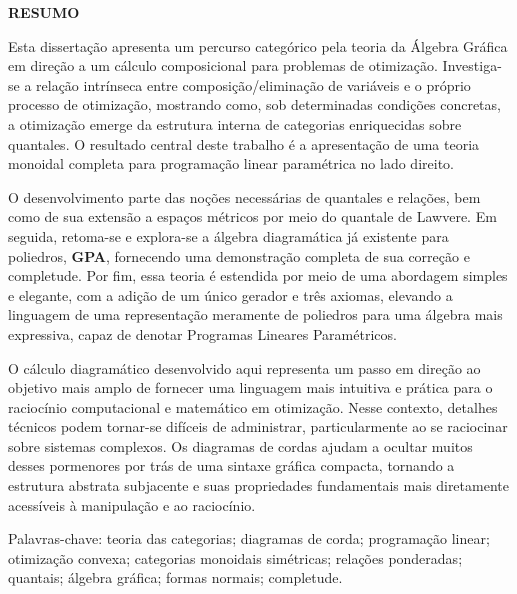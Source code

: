 \newpage
\thispagestyle{empty}
\begin{center}
  \textbf{\MakeUppercase{Resumo}}
\end{center}

\noindent
Esta dissertação apresenta um percurso categórico pela teoria da Álgebra Gráfica em direção a um cálculo composicional para problemas de otimização. Investiga-se a relação intrínseca entre composição/eliminação de variáveis e o próprio processo de otimização, mostrando como, sob determinadas condições concretas, a otimização emerge da estrutura interna de categorias enriquecidas sobre quantales. O resultado central deste trabalho é a apresentação de uma teoria monoidal completa para programação linear paramétrica no lado direito.

O desenvolvimento parte das noções necessárias de quantales e relações, bem como de sua extensão a espaços métricos por meio do quantale de Lawvere. Em seguida, retoma-se e explora-se a álgebra diagramática já existente para poliedros, \textbf{GPA}, fornecendo uma demonstração completa de sua correção e completude. Por fim, essa teoria é estendida por meio de uma abordagem simples e elegante, com a adição de um único gerador e três axiomas, elevando a linguagem de uma representação meramente de poliedros para uma álgebra mais expressiva, capaz de denotar Programas Lineares Paramétricos.

O cálculo diagramático desenvolvido aqui representa um passo em direção ao objetivo mais amplo de fornecer uma linguagem mais intuitiva e prática para o raciocínio computacional e matemático em otimização. Nesse contexto, detalhes técnicos podem tornar-se difíceis de administrar, particularmente ao se raciocinar sobre sistemas complexos. Os diagramas de cordas ajudam a ocultar muitos desses pormenores por trás de uma sintaxe gráfica compacta, tornando a estrutura abstrata subjacente e suas propriedades fundamentais mais diretamente acessíveis à manipulação e ao raciocínio.

\vspace{1em}
\noindent
Palavras-chave: teoria das categorias; diagramas de corda; programação linear;
otimização convexa; categorias monoidais simétricas; relações ponderadas;
quantais; álgebra gráfica; formas normais; completude.
\clearpage
